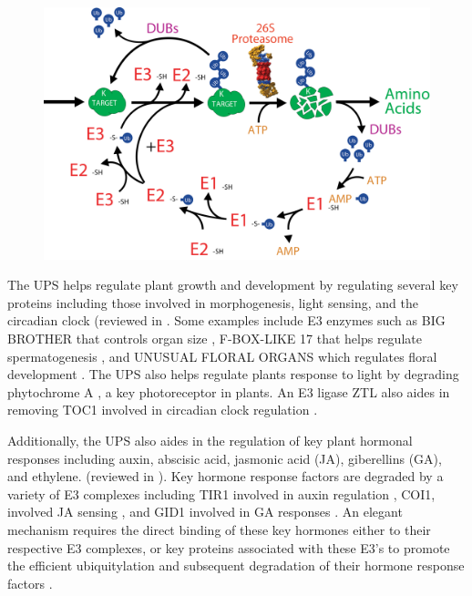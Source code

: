 \begin{figure}
	\centering
	\includegraphics[width=\columnwidth]{intro/upscycle.png}
	\label{fig:upscycle}
\end{figure}

	The UPS helps regulate plant growth and development by regulating several key proteins including those involved in morphogenesis, light sensing, and the circadian clock (reviewed in \citep{vierstra09}. Some examples include E3 enzymes such as BIG BROTHER that controls organ size \citep{disch06}, F-BOX-LIKE 17 that helps regulate spermatogenesis \citep{kim08}, and UNUSUAL FLORAL ORGANS which regulates floral development \citep{samach99}. The UPS also helps regulate plants response to light by degrading phytochrome A \citep{clough97, shanklin87}, a key photoreceptor in plants. An E3 ligase ZTL also aides in removing TOC1 involved in circadian clock regulation \citep{más03}. 

	Additionally, the UPS also aides in the regulation of key plant hormonal responses including auxin, abscisic acid, jasmonic acid (JA), giberellins (GA), and ethylene. (reviewed in \citep{santner10}). Key hormone response factors are degraded by a variety of E3 complexes including TIR1 involved in auxin regulation \citep{dharmasiri05}, COI1, involved JA sensing \citep{katsir08}, and GID1 involved in GA responses \citep{murase08}. An elegant mechanism requires the direct binding of these key hormones either to their respective E3 complexes, or key proteins associated with these E3’s to promote the efficient ubiquitylation and subsequent degradation of their hormone response factors \citep{shabek14}. 

